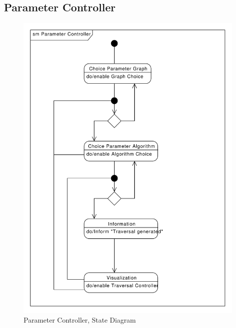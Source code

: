 \subsection{Parameter Controller}
\begin{figure}[H]
    \centering
    \includegraphics[width=\textwidth]{diagrams/sm-parameter-controller.pdf}
    \caption{Parameter Controller, State Diagram}
    \label{fig:sm-parameter-controller}
\end{figure}
% 
